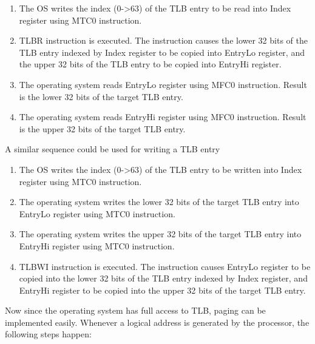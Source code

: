 \documentclass[oneside]{book}
\begin{document}
\begin{enumerate}

\item The OS writes the index (0->63) of the TLB entry to be read into
      Index register using MTC0 instruction.

\item TLBR instruction is executed. The instruction causes the lower 32
      bits of the TLB entry indexed by Index register to be copied into
      EntryLo register, and the upper 32 bits of the TLB entry to be copied
      into EntryHi register.

\item The operating system reads EntryLo register using MFC0 instruction.
      Result is the lower 32 bits of the target TLB entry.

\item The operating system reads EntryHi register using MFC0 instruction.
      Result is the upper 32 bits of the target TLB entry.

\end{enumerate}

A similar sequence could be used for writing a TLB entry

\begin{enumerate}

\item The OS writes the index (0->63) of the TLB entry to be written into
      Index register using MTC0 instruction.

\item The operating system writes the lower 32 bits of the target TLB
      entry into EntryLo register using MTC0 instruction.

\item The operating system writes the upper 32 bits of the target TLB
      entry into EntryHi register using MTC0 instruction.

\item TLBWI instruction is executed. The instruction causes EntryLo register
      to be copied into the lower 32 bits of the TLB entry indexed by Index register,
      and EntryHi register to be copied into the upper 32 bits of the target
      TLB entry.

\end{enumerate}

Now since the operating system has full access to TLB, paging can be
implemented easily. Whenever a logical address is generated by
the processor, the following steps happen:
\end{document}
